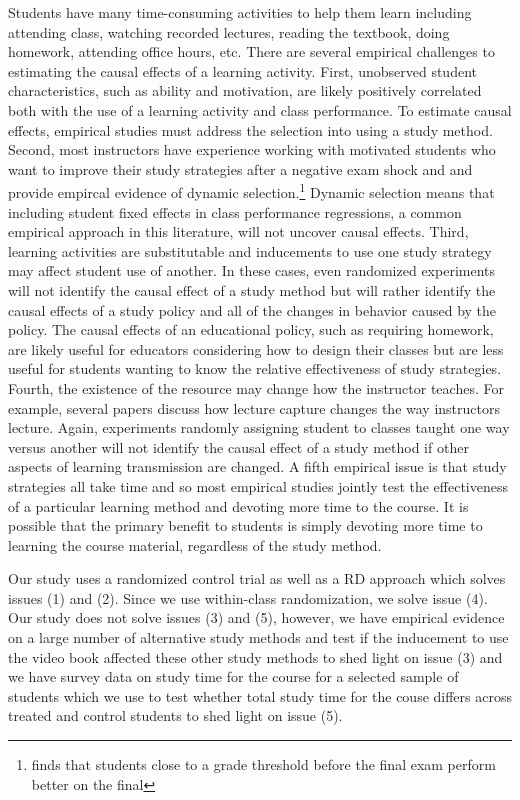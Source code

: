 \documentclass[12pt]{article}
\begin{document}
Students have many time-consuming activities to help them learn including attending class, watching recorded lectures, reading the textbook, doing homework, attending office hours, etc. There are several empirical challenges to estimating the causal effects of a learning activity. First, unobserved student characteristics, such as ability and motivation, are likely positively correlated both with the use of a learning activity and class performance. To estimate causal effects, empirical studies must address the selection into using a study method. Second, most instructors have experience working with motivated students who want to improve their study strategies after a negative exam shock and \textcite{oettinger2002} and \textcite{ss2008} provide empircal evidence of dynamic selection.\footnote{\textcite{oettinger2002} finds that students close to a grade threshold before the final exam perform better on the final}  Dynamic selection means that including student fixed effects in class performance regressions, a common empirical approach in this literature, will not uncover causal effects. Third, learning activities are substitutable and inducements to use one study strategy may affect student use of another. In these cases, even randomized experiments will not identify the causal effect of a study method but will rather identify the causal effects of a study policy and all of the changes in behavior caused by the policy. The causal effects of an educational policy, such as requiring homework, are likely useful for educators considering how to design their classes but are less useful for students wanting to know the relative effectiveness of study strategies. Fourth, the existence of the resource may change how the instructor teaches.  For example, several papers discuss how lecture capture changes the way instructors lecture.  Again, experiments randomly assigning student to classes taught one way versus another will not identify the causal effect of a study method if other aspects of learning transmission are changed.  A fifth empirical issue is that study strategies all take time and so most empirical studies jointly test the effectiveness of a particular learning method and devoting more time to the course. It is possible that the primary benefit to students is simply devoting more time to learning the course material, regardless of the study method.

Our study uses a randomized control trial as well as a RD approach which solves issues (1) and (2).  Since we use within-class randomization, we solve issue (4).  Our study does not solve issues (3) and (5), however, we have empirical evidence on a large number of alternative study methods and test if the inducement to use the video book affected these other study methods to shed light on issue (3) and we have survey data on study time for the course for a selected sample of students which we use to test whether total study time for the couse differs across treated and control students to shed light on issue (5).  
\end{document}
